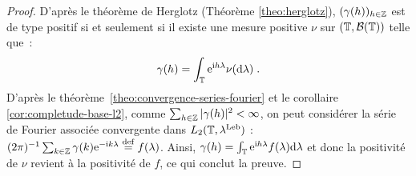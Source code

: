 \begin{proof}
D'apr\`es le th\'eor\`eme de Herglotz (Th\'eor\`eme \ref{theo:herglotz}),
$(\gamma(h))_{h \in \mathbb{Z}}$ est de type
positif si et seulement si il existe une mesure positive
 $\nu$ sur $(\mathbb{T},\mathcal{B}(\mathbb{T}))$ telle que~:
\begin{eqnarray*}
 \gamma(h) = \int_{\mathbb{T}} \mathrm{e}^{\mathrm{i} h\lambda} \nu(\mathrm{d}\lambda)\; .
\end{eqnarray*}
D'apr\`es le th\'eor\`eme~\ref{theo:convergence-series-fourier} et le
corollaire \ref{cor:completude-base-l2}, comme $\sum_{h\in \mathbb{Z}} |\gamma(h)|^2<\infty$, on peut consid\'erer
la s\'erie de Fourier associ\'ee convergente dans
$L_2(\mathbb{T},\lambda^{\mathrm{Leb}})$ :
$(2\pi)^{-1} \sum_{k \in \mathbb{Z}} \gamma(k) \mathrm{e}^{-\mathrm{i} k
  \lambda}\stackrel{\mathrm{def}}{=} f(\lambda)$.
Ainsi, $\gamma(h) = \int_{\mathbb{T}} \mathrm{e}^{\mathrm{i} h\lambda} f(\lambda)\mathrm{d}\lambda$
et donc la positivit\'e de $\nu$ revient \`a la positivit\'e de $f$, ce qui
conclut la preuve.




\end{proof}
